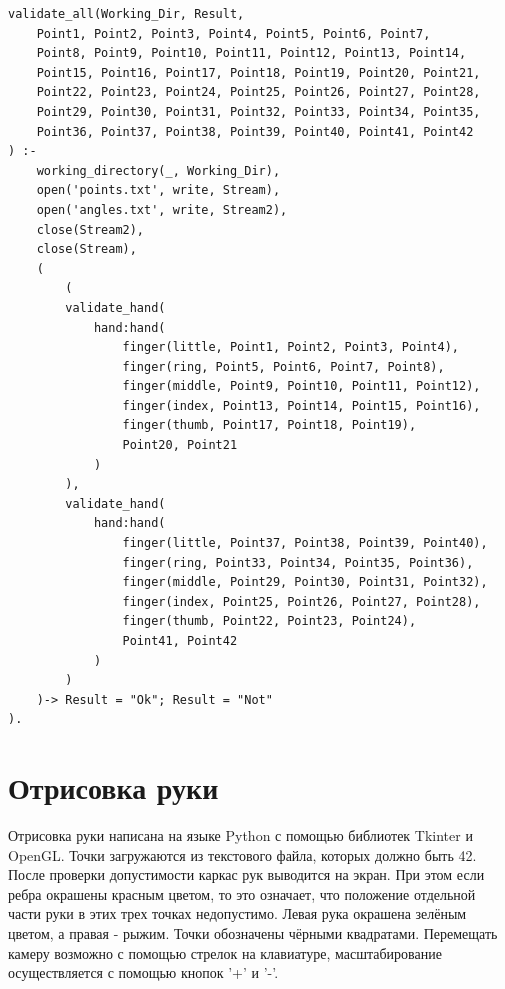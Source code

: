 \begin{lstlisting}[caption=Основная процедура проверки корректности точек, label=list:validate_all]
validate_all(Working_Dir, Result,
	Point1, Point2, Point3, Point4, Point5, Point6, Point7,
	Point8, Point9, Point10, Point11, Point12, Point13, Point14,
	Point15, Point16, Point17, Point18, Point19, Point20, Point21,
	Point22, Point23, Point24, Point25, Point26, Point27, Point28,
	Point29, Point30, Point31, Point32, Point33, Point34, Point35,
	Point36, Point37, Point38, Point39, Point40, Point41, Point42
) :-
	working_directory(_, Working_Dir),
	open('points.txt', write, Stream),
	open('angles.txt', write, Stream2),
	close(Stream2),
	close(Stream),
	(  
		(
		validate_hand(
			hand:hand(
				finger(little, Point1, Point2, Point3, Point4),
				finger(ring, Point5, Point6, Point7, Point8),
				finger(middle, Point9, Point10, Point11, Point12),
				finger(index, Point13, Point14, Point15, Point16),
				finger(thumb, Point17, Point18, Point19),
				Point20, Point21
			)
		),
		validate_hand(
			hand:hand(
				finger(little, Point37, Point38, Point39, Point40),
				finger(ring, Point33, Point34, Point35, Point36),
				finger(middle, Point29, Point30, Point31, Point32),
				finger(index, Point25, Point26, Point27, Point28),
				finger(thumb, Point22, Point23, Point24),
				Point41, Point42
			)
		)
	)-> Result = "Ok"; Result = "Not"
).

\end{lstlisting}

\newpage

\section{Отрисовка руки}
\hspace{0.6cm}Отрисовка руки написана на языке Python с помощью библиотек Tkinter и OpenGL. Точки загружаются из текстового файла, которых должно быть 42. После проверки допустимости каркас рук выводится на экран. При этом если ребра окрашены красным цветом, то это означает, что положение отдельной части руки в этих трех точках недопустимо. Левая рука окрашена зелёным цветом, а правая - рыжим. Точки обозначены чёрными квадратами.
\hspace{0.6cm}Перемещать камеру возможно с помощью стрелок на клавиатуре, масштабирование осуществляется с помощью кнопок '+' и '-'.

